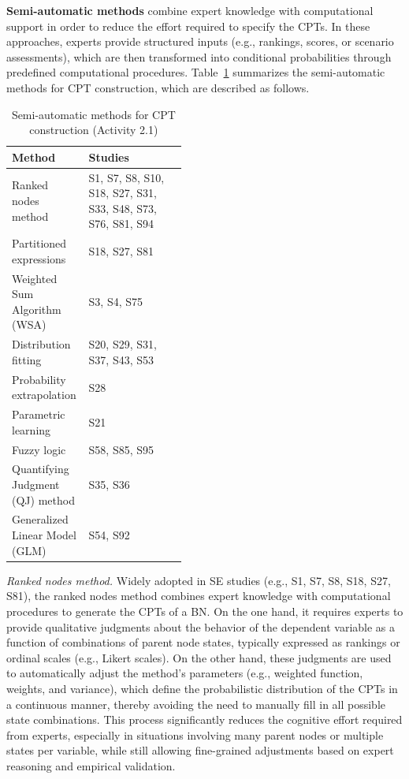 \textbf{Semi-automatic methods} combine expert knowledge with computational support in order to reduce the effort required to specify the CPTs. In these approaches, experts provide structured inputs (e.g., rankings, scores, or scenario assessments), which are then transformed into conditional probabilities through predefined computational procedures. Table~\ref{tab:metodos_semi_cpt} summarizes the semi-automatic methods for CPT construction, which are described as follows.

\begin{table}[t]
\caption{Semi-automatic methods for CPT construction (Activity 2.1)}
\label{tab:metodos_semi_cpt}
\centering
\small
\setlength{\tabcolsep}{6pt}
\renewcommand{\arraystretch}{1.2}

\begin{tabularx}{\linewidth}{>{\raggedright\arraybackslash}p{0.44\linewidth}
                              >{\raggedright\arraybackslash}X}
\toprule
\textbf{Method} & \textbf{Studies} \\
\midrule
Ranked nodes method
& S1, S7, S8, S10, S18, S27, S31, S33, S48, S73, S76, S81, S94 \\
Partitioned expressions
& S18, S27, S81 \\
Weighted Sum Algorithm (WSA)
& S3, S4, S75 \\
Distribution fitting
& S20, S29, S31, S37, S43, S53 \\
Probability extrapolation
& S28 \\
Parametric learning
& S21 \\
Fuzzy logic
& S58, S85, S95 \\
Quantifying Judgment (QJ) method
& S35, S36 \\
Generalized Linear Model (GLM)
& S54, S92 \\
\bottomrule
\end{tabularx}
\end{table}

\textit{Ranked nodes method.} Widely adopted in SE studies (e.g., S1, S7, S8, S18, S27, S81), the ranked nodes method combines expert knowledge with computational procedures to generate the CPTs of a BN. On the one hand, it requires experts to provide qualitative judgments about the behavior of the dependent variable as a function of combinations of parent node states, typically expressed as rankings or ordinal scales (e.g., Likert scales). On the other hand, these judgments are used to automatically adjust the method's parameters (e.g., weighted function, weights, and variance), which define the probabilistic distribution of the CPTs in a continuous manner, thereby avoiding the need to manually fill in all possible state combinations. This process significantly reduces the cognitive effort required from experts, especially in situations involving many parent nodes or multiple states per variable, while still allowing fine-grained adjustments based on expert reasoning and empirical validation.

